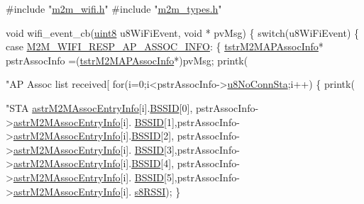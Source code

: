 \begin{DoxyCode}
\textcolor{preprocessor}{#include "\hyperlink{m2m__wifi_8h}{m2m\_wifi.h}"}
\textcolor{preprocessor}{#include "\hyperlink{m2m__types_8h}{m2m\_types.h}"}


\textcolor{keywordtype}{void} wifi\_event\_cb(\hyperlink{group__DataT_ga4df709a77647e870bbf1d955b8edc9a6}{uint8} u8WiFiEvent, \textcolor{keywordtype}{void} * pvMsg)
\{
    \textcolor{keywordflow}{switch}(u8WiFiEvent)
    \{
    \textcolor{keywordflow}{case} \hyperlink{group__WlanEnums_ggaa62989ea5e2977b374a04db81c89d524ae44909b7e419ce7c69f64ab8399ea67d}{M2M\_WIFI\_RESP\_AP\_ASSOC\_INFO}:
    \{
        \hyperlink{structtstrM2MAPAssocInfo}{tstrM2MAPAssocInfo}* pstrAssocInfo =(\hyperlink{structtstrM2MAPAssocInfo}{tstrM2MAPAssocInfo}*)pvMsg;
        printk(\textcolor{stringliteral}{"AP Assoc list received[%
        \textcolor{keywordflow}{for}(i=0;i<pstrAssocInfo->\hyperlink{structtstrM2MAPAssocInfo_a0529468d2d892e2549ba363186ec5c18}{u8NoConnSta};i++)
        \{
            printk(\textcolor{stringliteral}{"STA %
      \hyperlink{structtstrM2MAPAssocInfo_a42770504c3c5d3858f41de1431e251d1}{astrM2MAssocEntryInfo}[i].\hyperlink{structtstrM2MAssocEntryInfo_a85752c1bbc4407f1a7d98da273e132a3}{BSSID}[0],
                pstrAssocInfo->\hyperlink{structtstrM2MAPAssocInfo_a42770504c3c5d3858f41de1431e251d1}{astrM2MAssocEntryInfo}[i].
      \hyperlink{structtstrM2MAssocEntryInfo_a85752c1bbc4407f1a7d98da273e132a3}{BSSID}[1],pstrAssocInfo->\hyperlink{structtstrM2MAPAssocInfo_a42770504c3c5d3858f41de1431e251d1}{astrM2MAssocEntryInfo}[i].\hyperlink{structtstrM2MAssocEntryInfo_a85752c1bbc4407f1a7d98da273e132a3}{BSSID}[2],
                pstrAssocInfo->\hyperlink{structtstrM2MAPAssocInfo_a42770504c3c5d3858f41de1431e251d1}{astrM2MAssocEntryInfo}[i].
      \hyperlink{structtstrM2MAssocEntryInfo_a85752c1bbc4407f1a7d98da273e132a3}{BSSID}[3],pstrAssocInfo->\hyperlink{structtstrM2MAPAssocInfo_a42770504c3c5d3858f41de1431e251d1}{astrM2MAssocEntryInfo}[i].\hyperlink{structtstrM2MAssocEntryInfo_a85752c1bbc4407f1a7d98da273e132a3}{BSSID}[4],
                pstrAssocInfo->\hyperlink{structtstrM2MAPAssocInfo_a42770504c3c5d3858f41de1431e251d1}{astrM2MAssocEntryInfo}[i].
      \hyperlink{structtstrM2MAssocEntryInfo_a85752c1bbc4407f1a7d98da273e132a3}{BSSID}[5],pstrAssocInfo->\hyperlink{structtstrM2MAPAssocInfo_a42770504c3c5d3858f41de1431e251d1}{astrM2MAssocEntryInfo}[i].
      \hyperlink{structtstrM2MAssocEntryInfo_a5483d51e0b6af2ecbc83870fab1bb508}{s8RSSI});
        \}
                        
}}
\end{DoxyCode}
